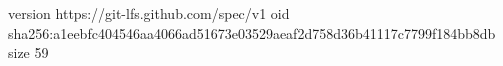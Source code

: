 version https://git-lfs.github.com/spec/v1
oid sha256:a1eebfc404546aa4066ad51673e03529aeaf2d758d36b41117c7799f184bb8db
size 59
